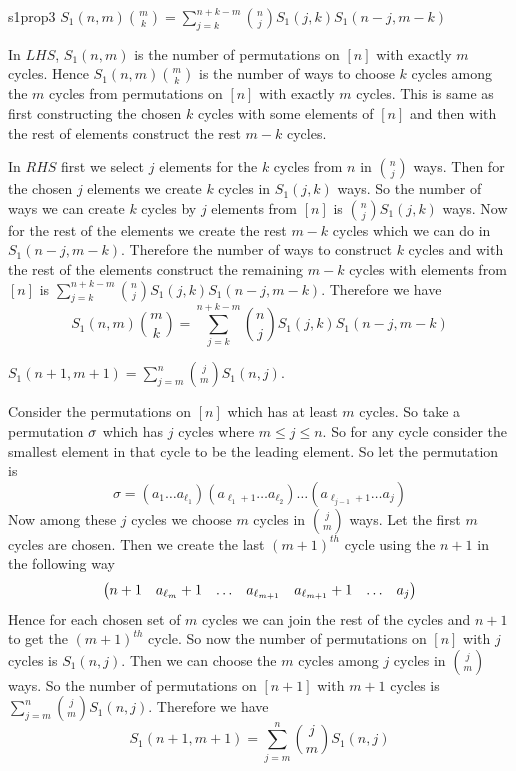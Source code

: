 \documentclass[twoside]{article}
\begin{document}
\begin{lemma}{}{s1prop3}
	$S_1(n,m)\displaystyle\binom{m}{k}=\sum_{j=k}^{n+k-m}\binom{n}{j}S_1(j,k)S_1(n-j,m-k)$
\end{lemma}
\begin{combi-proof}
	In $LHS$, $S_1(n,m)$ is the number of permutations on $[n]$ with exactly $m$ cycles. Hence $S_1(n,m)\binom{m}{k}$ is the number of ways to choose $k$ cycles among the $m$ cycles from permutations on $[n]$ with exactly $m$ cycles. This is same as first constructing the chosen $k$ cycles with some elements of $[n]$ and then with the rest of elements construct the rest $m-k$ cycles.
	
	In $RHS$ first we select  $j$ elements for the $k$ cycles from $n$ in $\binom{n}{j}$ ways. Then for the chosen $j$ elements we create $k$ cycles in $S_1(j,k)$ ways. So the number of ways we can create $k$ cycles by $j$ elements from $[n]$ is $\binom{n}{j}S_1(j,k)$ ways. Now for the rest of the elements we create the rest $m-k$ cycles which we can do in $S_1(n-j,m-k)$. Therefore the number of ways to construct $k$ cycles and with the rest of the elements construct the remaining $m-k$ cycles with elements from $[n]$ is $\sum\limits_{j=k}^{n+k-m}\binom{n}{j}S_1(j,k)S_1(n-j,m-k)$. Therefore we have $$S_1(n,m)\displaystyle\binom{m}{k}=\sum_{j=k}^{n+k-m}\binom{n}{j}S_1(j,k)S_1(n-j,m-k)$$
\end{combi-proof}
\begin{Theorem}{}{}
	$S_1(n+1,m+1)=\displaystyle\sum_{j=m}^n\binom{j}{m}S_1(n,j)$.
\end{Theorem}
\begin{combi-proof}
	Consider the permutations on $[n]$ which has at least $m$ cycles. So take a permutation $\sigma$ which has $j$ cycles where $m\leq j\leq n$. So for any cycle consider the smallest element in that cycle to be the leading element. So let the permutation is $$\sigma=(a_1\ldots a_{\ell_1})(a_{\ell_1+1}\ldots a_{\ell_2})\ldots(a_{\ell_{j-1}+1}\ldots a_j)$$Now among these $j$ cycles we choose $m$ cycles in $\binom{j}{m}$ ways. Let the first $m$ cycles are chosen. Then we create the last $(m+1)^{th}$ cycle using the $n+1$ in the following way $$\left(\begin{matrix}n+1 & a_{\ell_{m}}+1& \dots& a_{\ell_{m+1}}&a_{\ell_{m+1}}+1&\dots&a_j\end{matrix}\right)$$Hence for each chosen set of $m$ cycles we can join the rest of the cycles and $n+1$ to get the $(m+1)^{th}$ cycle. So now the number of permutations on $[n]$ with $j$ cycles is $S_1(n,j)$. Then we can choose the $m$ cycles among $j$ cycles in $\binom{j}{m}$ ways. So the number of permutations on $[n+1]$ with $m+1$ cycles is $\sum\limits_{j=m}^n\binom{j}{m}S_1(n,j)$. Therefore we have $$S_1(n+1,m+1)=\displaystyle\sum_{j=m}^n\binom{j}{m}S_1(n,j)$$
\end{combi-proof}
\end{document}
